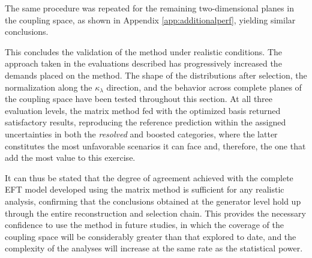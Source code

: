 The same procedure was repeated for the remaining two-dimensional planes in the coupling space, as shown in Appendix \ref{app:additionalperf}, yielding similar conclusions.\medskip



This concludes the validation of the method under realistic conditions. The approach taken in the evaluations described has progressively increased the demands placed on the method. The shape of the distributions after selection, the normalization along the $\kappa_\lambda$ direction, and the behavior across complete planes of the coupling space have been tested throughout this section. At all three evaluation levels, the matrix method fed with the optimized basis returned satisfactory results, reproducing the reference prediction within the assigned uncertainties in both the \textit{resolved} and boosted categories, where the latter constitutes the most unfavorable scenarios it can face and, therefore, the one that add the most value to this exercise.

It can thus be stated that the degree of agreement achieved with the complete EFT model developed using the matrix method is sufficient for any realistic analysis, confirming that the conclusions obtained at the generator level hold up through the entire reconstruction and selection chain. This provides the necessary confidence to use the method in future studies, in which the coverage of the coupling space will be considerably greater than that explored to date, and the complexity of the analyses will increase at the same rate as the statistical power.






